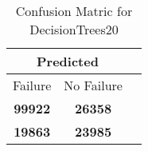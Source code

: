 \begin{table}[] 
\caption{Confusion Matric for DecisionTrees20} 
\label{Table: Prediction Accuracy-DMDDecisionTrees20OnlySunEKF-resetReflection-Reflection} 
\centering 
\begin{tabular} 
 {@{}ccc@{}} 
\toprule 
\multicolumn{2}{c}{\textbf{Predicted}}
 \\ \midrule 
\multicolumn{1}{|c|}{Failure} & 
\multicolumn{1}{c|}{No Failure}
 \\ \midrule 
\multicolumn{1}{|c|}{\color{green}\textbf{99922}} & 
\multicolumn{1}{c|}{\color{green}\textbf{26358}}
 \\ \midrule 
\multicolumn{1}{|c|}{\color{red}\textbf{19863}} & 
\multicolumn{1}{c|}{\color{red}\textbf{23985}}
 \\ \bottomrule 
\end{tabular} 
\end{table} 
